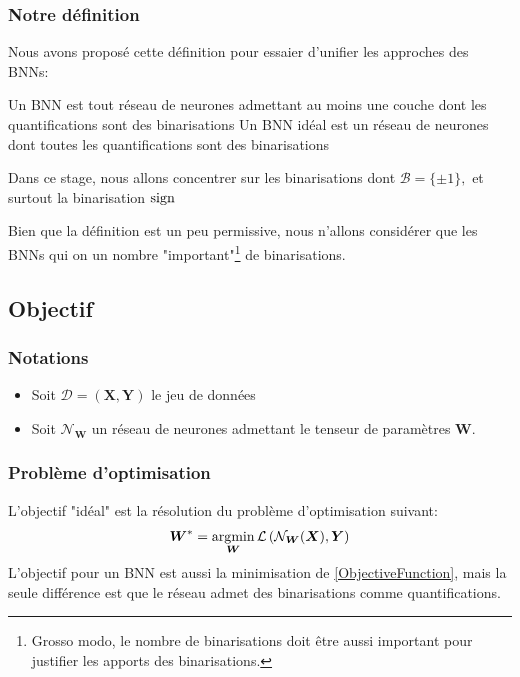 \subsubsection{Notre définition}
Nous avons proposé cette définition pour essaier d'unifier les approches des BNNs:
\begin{definition}
Un BNN est tout réseau de neurones admettant au moins une couche dont les quantifications sont des binarisations
\newline Un BNN idéal est un réseau de neurones dont toutes les quantifications sont des binarisations
\end{definition}
\begin{remark}
	Dans ce stage, nous allons concentrer sur les binarisations dont $\mathcal{B}=\{\pm 1\},$ et surtout la binarisation $\operatorname{sign}$
\end{remark}
\begin{remark}
	Bien que la définition est un peu permissive, nous n'allons considérer que les BNNs qui on un nombre "important"\footnote{Grosso modo, le nombre de binarisations doit être aussi important pour justifier les apports des binarisations.} de binarisations.
\end{remark}
\subsection{Objectif}
\subsubsection{Notations}
\begin{itemize}
\item Soit $\mathcal{D}=\left(\boldsymbol{X},\boldsymbol{Y}\right)$ le jeu de données
\item Soit $\mathcal{N}_{\boldsymbol{W}}$ un réseau de neurones admettant le tenseur de paramètres $\boldsymbol{W}.$ 
\end{itemize}
\subsubsection{Problème d'optimisation}
 L'objectif "idéal" est la résolution du problème d'optimisation suivant:
\begin{equation}\label{ObjectiveFunction}
	\boldsymbol{W}^*=\operatorname*{\arg\!\min}_{\boldsymbol{W}} \mathcal{L}\left(\mathcal{N}_{\boldsymbol{W}}(\boldsymbol{X}),\boldsymbol{Y}\right)
\end{equation}
L'objectif pour un BNN est aussi la minimisation de \eqref{ObjectiveFunction}, mais la seule différence est que le réseau admet des binarisations comme quantifications.
\newpage


